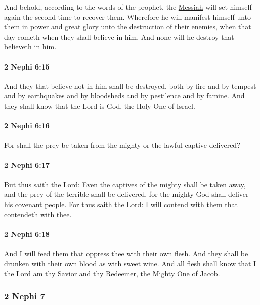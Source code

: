 			And behold, according to the words of the prophet,
			the \hyperref[MASHIACH]{Messiah} will set himself again the second time to recover them.
			Wherefore he will manifest himself unto them in power and great glory
			unto the destruction of their enemies,
			when that day cometh when they shall believe in him.
			And none will he destroy that believeth in him.

		\paragraph{2 Nephi 6:15} %
			\label{2NEPHI-6-15}

			And they that believe not in him shall be destroyed,
			both by fire and by tempest and by earthquakes
			and by bloodsheds and by pestilence and by famine.
			And they shall know that the Lord is God, the Holy One of Israel.

		\paragraph{2 Nephi 6:16} %
			\label{2NEPHI-6-16}

			For shall the prey be taken from the mighty
			or the lawful captive delivered?

		\paragraph{2 Nephi 6:17} %
			\label{2NEPHI-6-17}

			But thus saith the Lord:
			Even the captives of the mighty shall be taken away,
			and the prey of the terrible shall be delivered,
			for the mighty God shall deliver his covenant people.
			For thus saith the Lord:
			I will contend with them that contendeth with thee.

		\paragraph{2 Nephi 6:18} %
			\label{2NEPHI-6-18}

			And I will feed them that oppress thee with their own flesh.
			And they shall be drunken with their own blood as with sweet wine.
			And all flesh shall know that
			I the Lord am thy Savior and thy Redeemer, the Mighty One of Jacob.

	\subsubsection{2 Nephi 7} %
		\label{2NEPHI-7}
		
